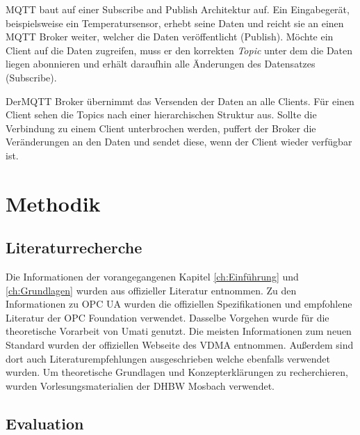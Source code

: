 \documentclass[a4paper, 12pt, oneside]{scrbook}
\begin{document}
		\ac{MQTT} baut auf einer Subscribe and Publish Architektur auf. Ein Eingabegerät, beispielsweise ein Temperatursensor, erhebt seine Daten und reicht sie an einen MQTT Broker weiter, welcher die Daten veröffentlicht (Publish). Möchte ein Client auf die Daten zugreifen, muss er den korrekten \textit{Topic} unter dem die Daten liegen abonnieren und erhält daraufhin alle Änderungen des Datensatzes (Subscribe).
		
		Der\ac{MQTT} Broker übernimmt das Versenden der Daten an alle Clients. Für einen Client sehen die Topics nach einer hierarchischen Struktur aus. Sollte die Verbindung zu einem Client unterbrochen werden, puffert der Broker die Veränderungen an den Daten und sendet diese, wenn der Client wieder verfügbar ist.
		
		
\chapter{Methodik}\label{ch:Methodiken}
	
	
	\section{Literaturrecherche}
	
	Die Informationen der vorangegangenen Kapitel \ref{ch:Einführung} und \ref{ch:Grundlagen} wurden aus offizieller Literatur entnommen. Zu den Informationen zu OPC UA wurden die offiziellen Spezifikationen und empfohlene Literatur der OPC Foundation verwendet. Dasselbe Vorgehen wurde für die theoretische Vorarbeit von Umati genutzt. Die meisten Informationen zum neuen Standard wurden der offiziellen Webseite des VDMA entnommen. Außerdem sind dort auch Literaturempfehlungen ausgeschrieben welche ebenfalls verwendet wurden. Um theoretische Grundlagen und Konzepterklärungen zu recherchieren, wurden Vorlesungsmaterialien der DHBW Mosbach verwendet.
	
	
	
	\section{Evaluation}
	
\end{document}
